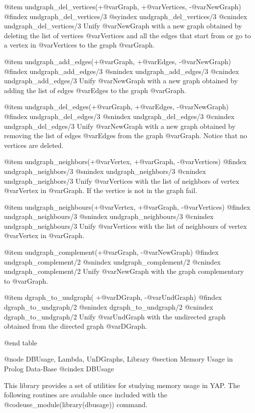 {{{{{{{{{@item undgraph_del_vertices(+@var{Graph}, +@var{Vertices}, -@var{NewGraph})
@findex  undgraph_del_vertices/3
@syindex undgraph_del_vertices/3
@cnindex undgraph_del_vertices/3
Unify @var{NewGraph} with a new graph obtained by deleting the list of
vertices @var{Vertices} and all the edges that start from or go to a
vertex in @var{Vertices} to the graph @var{Graph}.

@item undgraph_add_edges(+@var{Graph}, +@var{Edges}, -@var{NewGraph})
@findex  undgraph_add_edges/3
@snindex undgraph_add_edges/3
@cnindex undgraph_add_edges/3
Unify @var{NewGraph} with a new graph obtained by adding the list of
edges @var{Edges} to the graph @var{Graph}.

@item undgraph_del_edges(+@var{Graph}, +@var{Edges}, -@var{NewGraph})
@findex  undgraph_del_edges/3
@snindex undgraph_del_edges/3
@cnindex undgraph_del_edges/3
Unify @var{NewGraph} with a new graph obtained by removing the list of
edges @var{Edges} from the graph @var{Graph}. Notice that no vertices
are deleted.

@item undgraph_neighbors(+@var{Vertex}, +@var{Graph}, -@var{Vertices})
@findex  undgraph_neighbors/3
@snindex undgraph_neighbors/3
@cnindex undgraph_neighbors/3
Unify @var{Vertices} with the list of neighbors of vertex @var{Vertex}
in @var{Graph}. If the vertice is not in the graph fail.

@item undgraph_neighbours(+@var{Vertex}, +@var{Graph}, -@var{Vertices})
@findex  undgraph_neighbours/3
@snindex undgraph_neighbours/3
@cnindex undgraph_neighbours/3
Unify @var{Vertices} with the list of neighbours of vertex @var{Vertex}
in @var{Graph}.

@item undgraph_complement(+@var{Graph}, -@var{NewGraph})
@findex  undgraph_complement/2
@snindex undgraph_complement/2
@cnindex undgraph_complement/2
Unify @var{NewGraph} with the graph complementary to @var{Graph}.

@item dgraph_to_undgraph( +@var{DGraph}, -@var{UndGraph})
@findex  dgraph_to_undgraph/2
@snindex dgraph_to_undgraph/2
@cnindex dgraph_to_undgraph/2
Unify @var{UndGraph} with the undirected graph obtained from the
directed graph @var{DGraph}.

@end table

@node DBUsage, Lambda, UnDGraphs, Library
@section Memory Usage in Prolog Data-Base
@cindex DBUsage

This library provides a set of utilities for studying memory usage in YAP.
The following routines are available once included with the
@code{use_module(library(dbusage))} command.

}}}}}}}}}
